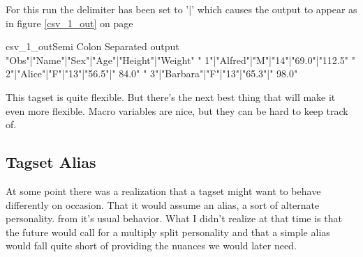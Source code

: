 
For this run the delimiter has been set to '|' which causes
the output to appear as in figure \ref{csv_1_out} on page \pageref{csv_1_out} 

\begin{poutput}{csv_1_out}{Semi Colon Separated output}
"Obs"|"Name"|"Sex"|"Age"|"Height"|"Weight"
" 1"|"Alfred"|"M"|"14"|"69.0"|"112.5"
" 2"|"Alice"|"F"|"13"|"56.5"|" 84.0"
" 3"|"Barbara"|"F"|"13"|"65.3"|" 98.0"
\end{poutput}
       
This tagset is quite flexible.  But there's the next best thing that will
make it even more flexible.  Macro variables are nice, but
they can be hard to keep track of.  

\subsection{Tagset Alias}
At some point there was a realization that a tagset might want to behave
differently on occasion.  That it would assume an alias, a sort of alternate
personality.
from it's usual behavior.   What I didn't realize at that time is that the
future would call for a multiply split personality and that a simple alias 
would fall quite short of providing the nuances we would later need.

